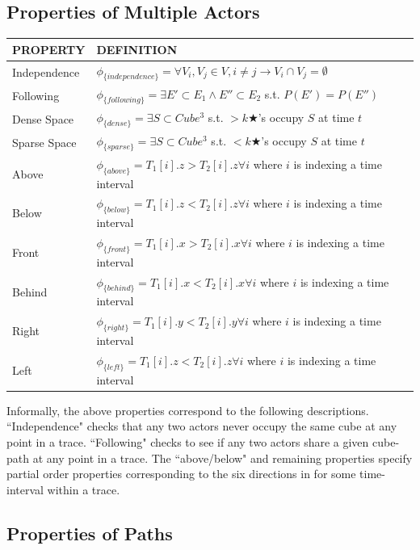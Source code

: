 \subsection{Properties of Multiple Actors}
\begin{tabular}{| p{2.8cm} | p{11.5cm} | }
\hline
PROPERTY & DEFINITION \\ \hline
 Independence& $\phi_{\{independence\}} =  \forall V_i,V_j \in V, i \neq j \rightarrow V_i \cap V_j = \emptyset $ \\ \hline
 Following & $\phi_{\{following\}} =  \exists E' \subset E_1 \land E'' \subset E_2$ s.t. $P(E')=P(E'') $  \\ \hline
 Dense Space & $\phi_{\{dense\}} = \exists S \subset Cube^3$ s.t. $> k \bigstar$'s occupy $S$ at time $t$\\ \hline
 Sparse Space & $\phi_{\{sparse\}} = \exists S \subset Cube^3$ s.t. $< k \bigstar$'s occupy $S$ at time $t$\\ \hline
 Above & $\phi_{\{above\}} =  T_1[i].z > T_2[i].z \forall i$ where $i$ is indexing a time interval\\ \hline
 Below & $\phi_{\{below\}} = T_1[i].z < T_2[i].z \forall i$ where $i$ is indexing a time interval\\ \hline
 Front & $\phi_{\{front\}} = T_1[i].x > T_2[i].x \forall i$ where $i$ is indexing a time interval\\ \hline
 Behind & $\phi_{\{behind\}} = T_1[i].x < T_2[i].x \forall i$ where $i$ is indexing a time interval\\ \hline
 Right & $\phi_{\{right\}} = T_1[i].y < T_2[i].y \forall i$ where $i$ is indexing a time interval \\ \hline
 Left & $\phi_{\{left\}} = T_1[i].z < T_2[i].z \forall i$ where $i$ is indexing a time interval \\ \hline
\end{tabular}

Informally, the above properties correspond to the following descriptions.
``Independence" checks that any two actors never occupy the same cube at any point in a trace.
``Following" checks to see if any two actors share a given cube-path at any point in a trace.
The ``above/below" and remaining properties specify partial order properties corresponding to the six directions in \rthree for some time-interval within a trace.

\subsection{Properties of Paths}
